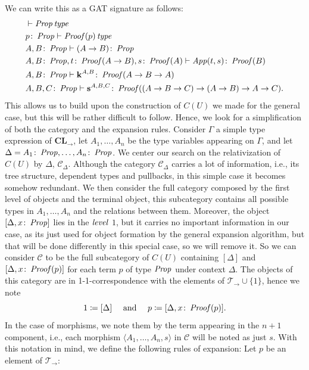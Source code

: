 We can write this as a GAT signature as follows: 
\begin{align*}
    &\vdash \operatorname{\mathit{Prop}} \operatorname{\mathit{\space type}} \\
    &p \colon \operatorname{\mathit{Prop}} \vdash \operatorname{\mathit{Proof}}(p) \operatorname{\mathit{\space type}} \\
    &A, B \colon \operatorname{\mathit{Prop}} \vdash (A \to B) \colon \operatorname{\mathit{Prop}} \\
    &A, B \colon \operatorname{\mathit{Prop}}, t \colon \operatorname{\mathit{Proof}}(A \to B), s \colon \operatorname{\mathit{Proof}}(A) \vdash \operatorname{\mathit{App}}(t, s) \colon \operatorname{\mathit{Proof}}(B) \\
    &A, B \colon \operatorname{\mathit{Prop}} \vdash \operatorname{\mathbf{k}}^{A, B} \colon \operatorname{\mathit{Proof}}(A \to B \to A) \\
    &A, B, C \colon \operatorname{\mathit{Prop}} \vdash \operatorname{\mathbf{s}}^{A, B, C} \colon \operatorname{\mathit{Proof}}((A \to B \to C) \to (A \to B) \to A \to C).
\end{align*}
This allows us to build upon the construction of $C(U)$ we made for the general case, but this will be rather difficult
to follow. Hence, we look for a simplification of both the category and the expansion rules.
Consider $\Gamma$ a simple type expression of $\textbf{CL}_\to$, let $A_1, \dots, A_n$ be the type variables appearing on $\Gamma$,
and let $\Delta = A_1 \colon \operatorname{\mathit{Prop}}, \dots, A_n \colon \operatorname{\mathit{Prop}}$. We center our search on the relativization of $C(U)$ by $\Delta$,
$\mathcal{C}_\Delta$. Although the category $\mathcal{C}_\Delta$ carries a lot of information, i.e., its tree structure, dependent types and pullbacks,
in this simple case it becomes somehow redundant. We then consider the full category composed by the first level of objects and the terminal object,
this subcategory contains all possible types in $A_1, \dots, A_n$ and the relations between them.  
Moreover, the object $[\Delta, x \colon \operatorname{\mathit{Prop}}]$ lies in the $\operatorname{\mathit{level}}$ $1$,
but it carries no important information in our case, as its just used for object formation by the general expansion algorithm, but 
that will be done differently in this special case, so we will remove it.
So we can consider $\mathcal{C}$ to be the full subcategory of $C(U)$ containing $[\Delta]$ and $[\Delta, x \colon \operatorname{\mathit{Proof}}(p)]$ for each term $p$
of type $\operatorname{\mathit{Prop}}$ under context $\Delta$.
The objects of this category are in 1-1-correspondence with the elements of $\mathcal{T}_\to \cup \{ 1 \}$, hence we note \[
    1 \coloneqq [\Delta] \quad \text{ and } \quad  p \coloneqq [\Delta, x \colon \operatorname{\mathit{Proof}}(p)].
\]
In the case of morphisms, we note them by the term appearing in the $n+1$ component, i.e., each morphism $\langle A_1, \dots, A_n, s \rangle$
in $\mathcal{C}$ will be noted as just $s$.
With this notation in mind, we define the following rules of expansion: Let $p$ be an element of $\mathcal{T}_\to$:
